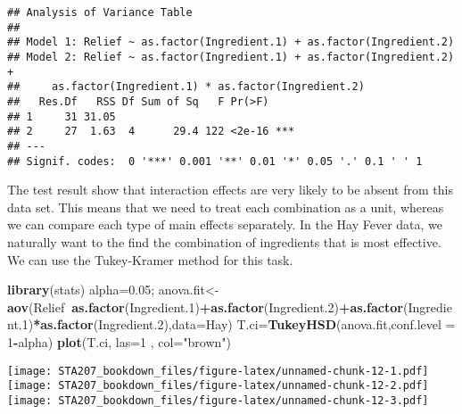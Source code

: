 \documentclass[12pt,]{book}
\newenvironment{Shaded}{\begin{snugshade}}{\end{snugshade}}
\newcommand{\KeywordTok}[1]{\textcolor[rgb]{0.13,0.29,0.53}{\textbf{#1}}}
\newcommand{\DataTypeTok}[1]{\textcolor[rgb]{0.13,0.29,0.53}{#1}}
\newcommand{\DecValTok}[1]{\textcolor[rgb]{0.00,0.00,0.81}{#1}}
\newcommand{\FloatTok}[1]{\textcolor[rgb]{0.00,0.00,0.81}{#1}}
\newcommand{\StringTok}[1]{\textcolor[rgb]{0.31,0.60,0.02}{#1}}
\newcommand{\CommentTok}[1]{\textcolor[rgb]{0.56,0.35,0.01}{\textit{#1}}}
\newcommand{\OperatorTok}[1]{\textcolor[rgb]{0.81,0.36,0.00}{\textbf{#1}}}
\newcommand{\NormalTok}[1]{#1}
\begin{document}
\begin{verbatim}
## Analysis of Variance Table
## 
## Model 1: Relief ~ as.factor(Ingredient.1) + as.factor(Ingredient.2)
## Model 2: Relief ~ as.factor(Ingredient.1) + as.factor(Ingredient.2) + 
##     as.factor(Ingredient.1) * as.factor(Ingredient.2)
##   Res.Df   RSS Df Sum of Sq   F Pr(>F)    
## 1     31 31.05                            
## 2     27  1.63  4      29.4 122 <2e-16 ***
## ---
## Signif. codes:  0 '***' 0.001 '**' 0.01 '*' 0.05 '.' 0.1 ' ' 1
\end{verbatim}

The test result show that interaction effects are very likely to be
absent from this data set. This means that we need to treat each
combination as a unit, whereas we can compare each type of main effects
separately. In the Hay Fever data, we naturally want to the find the
combination of ingredients that is most effective. We can use the
Tukey-Kramer method for this task.

\begin{Shaded}
\begin{Highlighting}[]
\KeywordTok{library}\NormalTok{(stats)}
\NormalTok{alpha=}\FloatTok{0.05}\NormalTok{;}
\NormalTok{anova.fit<-}\KeywordTok{aov}\NormalTok{(Relief}\OperatorTok{~}\KeywordTok{as.factor}\NormalTok{(Ingredient.}\DecValTok{1}\NormalTok{)}\OperatorTok{+}\KeywordTok{as.factor}\NormalTok{(Ingredient.}\DecValTok{2}\NormalTok{)}\OperatorTok{+}\KeywordTok{as.factor}\NormalTok{(Ingredient.}\DecValTok{1}\NormalTok{)}\OperatorTok{*}\KeywordTok{as.factor}\NormalTok{(Ingredient.}\DecValTok{2}\NormalTok{),}\DataTypeTok{data=}\NormalTok{Hay)}
\NormalTok{T.ci=}\KeywordTok{TukeyHSD}\NormalTok{(anova.fit,}\DataTypeTok{conf.level =} \DecValTok{1}\OperatorTok{-}\NormalTok{alpha)}
\KeywordTok{plot}\NormalTok{(T.ci, }\DataTypeTok{las=}\DecValTok{1}\NormalTok{ , }\DataTypeTok{col=}\StringTok{"brown"}\NormalTok{)}
\end{Highlighting}
\end{Shaded}

\texttt{[image: STA207\_bookdown\_files/figure-latex/unnamed-chunk-12-1.pdf]}
\texttt{[image: STA207\_bookdown\_files/figure-latex/unnamed-chunk-12-2.pdf]}
\texttt{[image: STA207\_bookdown\_files/figure-latex/unnamed-chunk-12-3.pdf]}

\begin{Shaded}
\end{Shaded}
\end{document}
